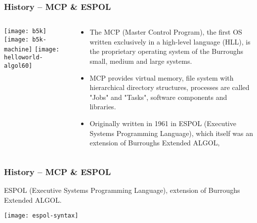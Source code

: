 \begin{frame}[plain]
	\frametitle{History -- MCP \& ESPOL}
	
	

\begin{columns}
	
	\begin{column}{.4\textwidth}
		\centering
		\texttt{[image: b5k]}
		\texttt{[image: b5k-machine]}
		\texttt{[image: helloworld-algol60]}
	\end{column}
	
	\begin{column}{.6\textwidth}
		
		
		\begin{itemize}
			\item The MCP (Master Control Program), the first OS written exclusively in a high-level language (HLL), is the proprietary operating system of the Burroughs small, medium and large systems.
			\item MCP provides virtual memory, file system with hierarchical directory structures, processes are called "Jobs" and "Tasks", software components and libraries.
			
			\item  Originally written in 1961 in ESPOL (Executive Systems Programming Language), which itself was an extension of Burroughs Extended ALGOL,
		\end{itemize}
		
		
	\end{column}
	
	
\end{columns}

\end{frame}






\begin{frame}[plain]
	\frametitle{History -- MCP \& ESPOL}
	
	ESPOL (Executive Systems Programming Language), extension of Burroughs Extended ALGOL.
	\centering
	
	\texttt{[image: espol-syntax]}
	
\end{frame}

